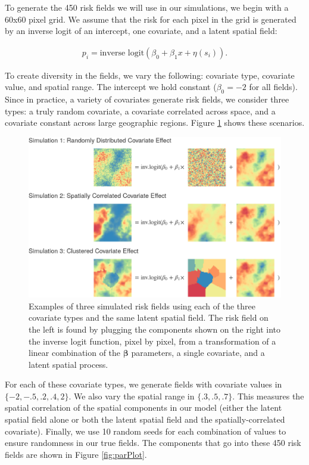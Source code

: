 \documentclass{article}
\begin{document}
To generate the 450 risk fields we will use in our simulations, we begin with a 60x60 pixel grid. We assume that the risk for each pixel in the grid is generated by an inverse logit of an intercept, one covariate, and a latent spatial field:

\begin{align}\label{lin}
p_i=\text{inverse logit}(\beta_0+\beta_1x+ \eta(s_i)).
\end{align}

To create diversity in the fields, we vary the following: covariate type, covariate value, and spatial range. The intercept we hold constant ($\beta_0=-2$ for all fields). Since in practice, a variety of covariates generate risk fields, we consider three types: a truly random covariate, a covariate correlated across space, and a covariate constant across large geographic regions. Figure \ref{fig:simPlot} shows these scenarios.

\begin{figure}[ht]
    \centering
    \includegraphics[width=.7\textwidth]{./figures/covariateeffects.png}
    \caption{Examples of three simulated risk fields using each of the three covariate types and the same latent spatial field. The risk field on the left is found by plugging the components shown on the right into the inverse logit function, pixel by pixel, from a transformation of a linear combination of the $\boldsymbol{\beta}$ parameters, a single covariate, and a latent spatial process.}
    \label{fig:simPlot}
\end{figure} 

For each of these covariate types, we generate fields with covariate values in $\{-2, -.5, .2, .4, 2\}$. We also vary the spatial range in $\{.3, .5, .7\}$. This measures the spatial correlation of the spatial components in our model (either the latent spatial field alone or both the latent spatial field and the spatially-correlated  covariate). Finally, we use 10 random seeds for each combination of values to ensure randomness in our true fields. The components that go into these 450 risk fields are shown in Figure \ref{fig:parPlot}.
\end{document}
